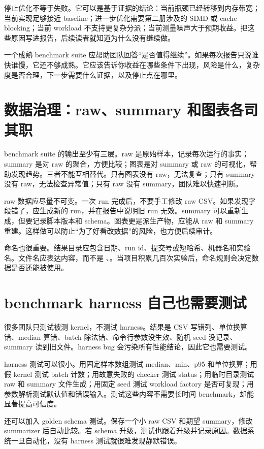 停止优化不等于失败。它可以是基于证据的结论：当前瓶颈已经转移到内存带宽；当前实现足够接近 baseline；进一步优化需要第二册涉及的 SIMD 或 cache blocking；当前 workload 不支持更复杂分派；当前测量噪声大于预期收益。把这些原因写进报告，后续读者就知道为什么没有继续做。

一个成熟 benchmark suite 应帮助团队回答“是否值得继续”。如果每次报告只说谁快谁慢，它还不够成熟。它应该告诉你收益在哪些条件下出现，风险是什么，复杂度是否合理，下一步需要什么证据，以及停止点在哪里。

\section{数据治理：raw、summary 和图表各司其职}

benchmark suite 的输出至少有三层。raw 是原始样本，记录每次运行的事实；summary 是对 raw 的聚合，方便比较；图表是对 summary 或 raw 的可视化，帮助发现趋势。三者不能互相替代。只有图表没有 raw，无法复查；只有 summary 没有 raw，无法检查异常值；只有 raw 没有 summary，团队难以快速判断。

raw 数据应尽量不可变。一次 run 完成后，不要手工修改 raw CSV。如果发现字段错了，应生成新的 run，并在报告中说明旧 run 无效。summary 可以重新生成，但要记录脚本版本和 schema。图表更是派生产物，应能从 raw 和 summary 重建。这样做可以防止“为了好看改数据”的风险，也方便后续审计。

命名也很重要。结果目录应包含日期、run id、提交号或短哈希、机器名和实验名。文件名应表达内容，而不是 、。当项目积累几百次实验后，命名规则会决定数据是否还能被使用。

\section{benchmark harness 自己也需要测试}

很多团队只测试被测 kernel，不测试 harness。结果是 CSV 写错列、单位换算错、median 算错、batch 除法错、命令行参数没生效、随机 seed 没记录、summary 读到旧文件。harness bug 会污染所有性能结论，因此它也需要测试。

harness 测试可以很小。用固定样本数组测试 median、min、p95 和单位换算；用假 kernel 测试 batch 计数；用故意失败的 checker 测试 status；用临时目录测试 raw 和 summary 文件生成；用固定 seed 测试 workload factory 是否可复现；用参数解析测试默认值和错误输入。测试这些内容不需要长时间 benchmark，却能显著提高可信度。

还可以加入 golden schema 测试。保存一个小 raw CSV 和期望 summary，修改 summarizer 后自动比较。若 schema 升级，测试也跟着升级并记录原因。数据系统一旦自动化，没有 harness 测试就很难发现静默错误。

